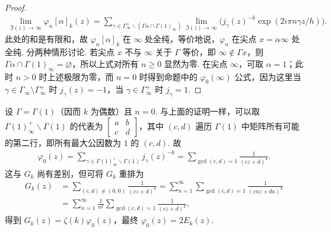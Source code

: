 \begin{proof}
\begin{align*}
\lim_{\Im(z)\to\infty}\varphi_n[\alpha]_k(z)=\sum_{\gamma\in\Gamma_\infty^+\backslash(\Gamma\alpha\cap\Gamma(1)_\infty)}\lim_{\Im(z)\to\infty}\bigl(j_\gamma(z)^{-k}\exp(2i\pi n\gamma z/h)\bigr).
\end{align*}
此处的和是有限和，故 $\varphi_n[\alpha]_k$ 在 $\infty$ 处全纯，等价地说，$\varphi_n$ 在尖点 $x=\alpha\infty$ 处全纯. 分两种情形讨论.
若尖点 $x$ 不与 $\infty$ 关于 $\Gamma$ 等价，即 $\infty\notin\Gamma x$，则 $\Gamma\alpha\cap\Gamma(1)_\infty=\varnothing$，所以上式对所有 $n\geqslant0$ 显然为零.
在尖点 $\infty$，可取 $\alpha=1$；此时 $n>0$ 时上述极限为零，而 $n=0$ 时得到命题中的 $\varphi_0(\infty)$ 公式，因为这里当 $\gamma\in\Gamma_\infty\setminus\Gamma_\infty^+$ 时 $j_\gamma(z)=-1$，当 $\gamma\in\Gamma_\infty^+$ 时 $j_\gamma=1$.
\end{proof}
\begin{remark*}
设 $\Gamma=\Gamma(1)$（因而 $k$ 为偶数）且 $n=0$. 与上面的证明一样，可以取 $\Gamma(1)_\infty^+\backslash\Gamma(1)$ 的代表为 $\left[\begin{smallmatrix}a&b\\c&d\end{smallmatrix}\right]$，其中 $(c,d)$ 遍历 $\Gamma(1)$ 中矩阵所有可能的第二行，即所有最大公因数为 $1$ 的 $(c,d)$. 故
\begin{align*}
\varphi_0(z)=\sum_{\gamma\in\Gamma(1)_\infty^+\backslash\Gamma(1)}j_\gamma(z)^{-k}=\sum_{\gcd(c,d)=1}\frac{1}{(cz+d)^k}.
\end{align*}
这与 $G_k$ 尚有差别，但可将 $G_k$ 重排为
\begin{align*}
G_k(z)&=\sum_{(c,d)\ne(0,0)}\frac{1}{(cz+d)^k}=\sum_{n=1}^\infty\sum_{\gcd(c,d)=1}\frac{1}{(cnz+dn)^k}\\
&=\sum_{n=1}^\infty\frac{1}{n^k}\sum_{\gcd(c,d)=1}\frac{1}{(cz+d)^k},
\end{align*}
得到 $G_k(z)=\zeta(k)\varphi_0(z)$，最终 $\varphi_0(z)=2E_k(z)$.
\end{remark*}
